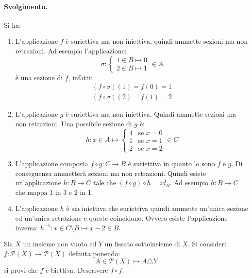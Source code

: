 \paragraph*{Svolgimento.} 	Si ha:
\begin{enumerate}
	\item L'applicazione $f$ è suriettiva ma non iniettiva, quindi ammette sezioni ma non retrazioni. Ad esempio l'applicazione:
	\begin{displaymath}
		\sigma : \left\lbrace
		\begin{array}{l}
			1  \in B \mapsto 0 \\
			2 \in B \mapsto 1
		\end{array} \right. \in A
	\end{displaymath}
	è una sezione di $f$, infatti:
	\begin{displaymath}
		\begin{array}{l}
			(f \circ \sigma)(1) = f(0) = 1 \\
			(f \circ \sigma)(2) = f(1) = 2
		\end{array}
	\end{displaymath}
	\item L'applicazione $g$ è suriettiva ma non iniettiva. Quindi ammette sezioni ma non retrazioni. Una possibile sezione di $g$ è:
	\begin{displaymath}
		h: x \in A \mapsto \left\lbrace \begin{array}{ll}
			4 & \mbox{se $x=0$}\\
			1 & \mbox{se $x=1$}\\
			2 & \mbox{se $x=2$}
		\end{array} \right. \in C
	\end{displaymath}
	\item L'applicazione composta $f \circ g: C \rightarrow B$ è suriettiva in quanto lo sono $f$ e $g$. Di conseguenza ammetterà sezioni ma non retrazioni. Quindi esiste un'applicazione $h : B \rightarrow C$ tale che $(f \circ g) \circ h = id_{B}$. Ad esempio $h : B \rightarrow C$ che mappa 1 in 3 e 2 in 1.
	\item L'applicazione $h$ è sia iniettiva che suriettiva quindi ammette un'unica sezione ed un'unica retrazione e queste coincidono. Ovvero esiste l'applicazione inversa: $h^{-1}: x \in C \setminus B \mapsto x-2 \in B$.\hfill \blacksquare
\end{enumerate}
\begin{exsbox}
	Sia $X$ un insieme non vuoto ed $Y$ un fissato sottoinsieme di $X$. Si consideri $f: \mathcal{P}(X) \rightarrow \mathcal{P}(X)$ definita ponendo:
	\begin{equation}
		A \in \mathcal{P}(X) \mapsto A \triangle Y
	\end{equation}
	si provi che $f$ è biettiva. Descrivere $f \circ f$.
\end{exsbox}
